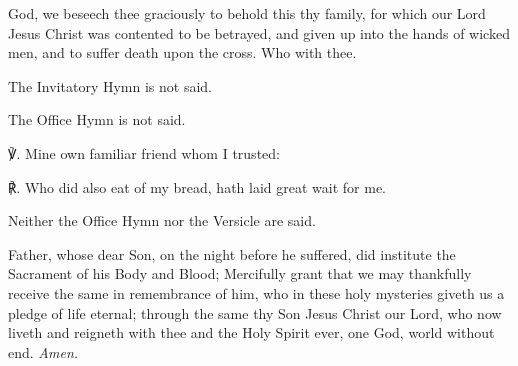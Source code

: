 
\secondEvensong



 God, we beseech thee graciously to behold this thy family, for which our Lord Jesus Christ was contented to be betrayed, and given up into the hands of wicked men, and to suffer death upon the cross. Who with thee.


\clearpage
{}
\fancyhead[RE,LO]{}

\mattins

\begin{rubric}
	The Invitatory Hymn is not said.
\end{rubric}


\begin{rubric}
	The Office Hymn is not said.
\end{rubric}

℣. Mine own familiar friend whom I trusted:

℟. Who did also eat of my bread, hath laid great wait for me.


\secondEvensong


\begin{rubric}
	Neither the Office Hymn nor the Versicle are said.
\end{rubric}


\collect
{} Father, whose dear Son, on the night before he suffered, did institute the Sacrament of his Body and Blood; Mercifully grant that we may thankfully receive the same in remembrance of him, who in these holy mysteries giveth us a pledge of life eternal; through the same thy Son Jesus Christ our Lord, who now liveth and reigneth with thee and the Holy Spirit ever, one God, world without end. \textit{Amen.}


